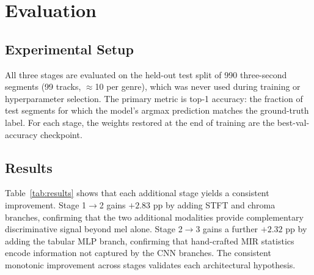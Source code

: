 \documentclass[10pt, twocolumn, a4paper]{article}
\begin{document}
\section{Evaluation}

\subsection{Experimental Setup}

All three stages are evaluated on the held-out test split of 990 three-second segments (99 tracks, $\approx$10 per genre), which was never used during training or hyperparameter selection. The primary metric is top-1 accuracy: the fraction of test segments for which the model's argmax prediction matches the ground-truth label. For each stage, the weights restored at the end of training are the best-val-accuracy checkpoint.

\subsection{Results}

Table~\ref{tab:results} shows that each additional stage yields a consistent improvement. Stage 1$\to$2 gains $+2.83$ pp by adding STFT and chroma branches, confirming that the two additional modalities provide complementary discriminative signal beyond mel alone. Stage 2$\to$3 gains a further $+2.32$ pp by adding the tabular MLP branch, confirming that hand-crafted MIR statistics encode information not captured by the CNN branches. The consistent monotonic improvement across stages validates each architectural hypothesis.

\begin{table}[H]
\centering
\caption{Test-set accuracy for each model stage.}
\label{tab:results}
\end{table}
\end{document}
